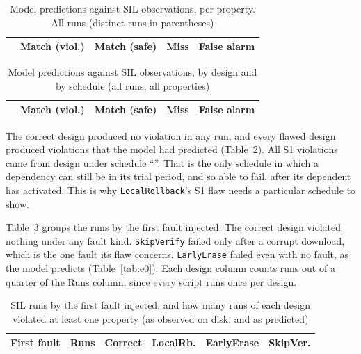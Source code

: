 \documentclass[journal]{IEEEtran}
\begin{document}
\begin{table}[t]
\caption{Model predictions against SIL observations, per property. All runs (distinct runs in parentheses)}
\label{tab:confusion}
\centering
\footnotesize
\setlength{\tabcolsep}{3pt}
\begin{tabular}{@{}lrrrr@{}}
\toprule
& Match (viol.) & Match (safe) & Miss & False alarm \\
\midrule

\end{tabular}
\end{table}

\begin{table}[t]
\caption{Model predictions against SIL observations, by design and by schedule (all runs, all properties)}
\label{tab:silbreak}
\centering
\footnotesize
\setlength{\tabcolsep}{3pt}
\begin{tabular}{@{}lrrrr@{}}
\toprule
& Match (viol.) & Match (safe) & Miss & False alarm \\
\midrule

\end{tabular}
\end{table}

The correct design produced no violation in any run, and every flawed design produced violations that the model had predicted (Table~\ref{tab:silbreak}). All \SilSOneViol{} S1 violations came from design \texttt{\SilSOneDesigns} under schedule ``\SilSOnePolicies''. That is the only schedule in which a dependency can still be in its trial period, and so able to fail, after its dependent has activated. This is why \texttt{LocalRollback}'s S1 flaw needs a particular schedule to show.

Table~\ref{tab:silfaults} groups the runs by the first fault injected. The correct design violated nothing under any fault kind. \texttt{SkipVerify} failed only after a corrupt download, which is the one fault its flaw concerns. \texttt{EarlyErase} failed even with no fault, as the model predicts (Table~\ref{tab:e0}). Each design column counts runs out of a quarter of the Runs column, since every script runs once per design.

\begin{table}[t]
\caption{SIL runs by the first fault injected, and how many runs of each design violated at least one property (as observed on disk, and as predicted)}
\label{tab:silfaults}
\centering
\scriptsize
\setlength{\tabcolsep}{2pt}
\begin{tabular}{@{}lrrrrr@{}}
\toprule
First fault & Runs & Correct & LocalRb. & EarlyErase & SkipVer. \\
\midrule

\end{tabular}
\end{table}
\end{document}
